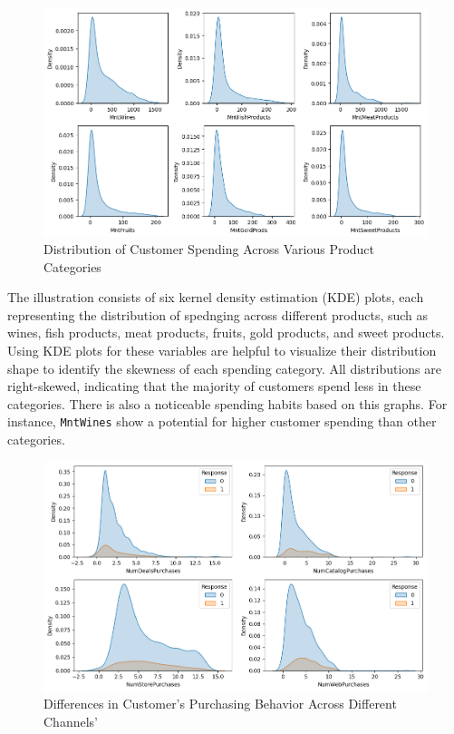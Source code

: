 \begin{figure}[H]
    \centering
    \includegraphics[width=\linewidth]{figures/spending_products.png}
    \caption{Distribution of Customer Spending Across Various Product Categories}
\end{figure}

The illustration consists of six kernel density estimation (KDE) plots, each representing the distribution of spednging across different products, such as wines, fish products, meat products, fruits, gold products, and sweet products. Using KDE plots for these variables are helpful to visualize their distribution shape to identify the skewness of each spending category. All distributions are right-skewed, indicating that the majority of customers spend less in these categories. There is also a noticeable spending habits based on this graphs. For instance, \texttt{MntWines} show a potential for higher customer spending than other categories.

\begin{figure}[H]
    \centering
    \includegraphics[width=\linewidth]{figures/num_purchases.png}
    \caption{Differences in Customer's Purchasing Behavior Across Different Channels'}
\end{figure}

